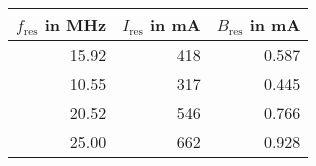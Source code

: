 \begin{tabular}{rrr}
\toprule
$f_\mathrm{res}$ in \si{\mega\hertz} & $I_\mathrm{res}$ in \si{\milli\ampere} & $B_\mathrm{res}$ in \si{\milli\ampere} \\
\midrule
                               15.92 &                                    418 &                                  0.587 \\
                               10.55 &                                    317 &                                  0.445 \\
                               20.52 &                                    546 &                                  0.766 \\
                               25.00 &                                    662 &                                  0.928 \\
\bottomrule
\end{tabular}
